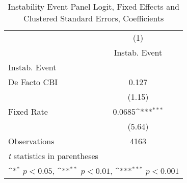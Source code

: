\begin{table}[htbp]\centering
\def\sym#1{\ifmmode^{#1}\else\(^{#1}\)\fi}
\caption{Instability Event Panel Logit, Fixed Effects and Clustered Standard Errors, Coefficients \label{coeffsJustBinInstabEventDF}}
\begin{tabular}{l*{1}{c}}
\toprule
                                        &\multicolumn{1}{c}{(1)}\\
                                        &\multicolumn{1}{c}{Instab. Event}\\
\midrule
Instab. Event                           &                  \\
De Facto CBI                            &    0.127         \\
                                        &   (1.15)         \\
\addlinespace
Fixed Rate                              &   0.0685\sym{***}\\
                                        &   (5.64)         \\
\midrule
Observations                            &     4163         \\
\bottomrule
\multicolumn{2}{l}{\footnotesize \textit{t} statistics in parentheses}\\
\multicolumn{2}{l}{\footnotesize \sym{*} \(p<0.05\), \sym{**} \(p<0.01\), \sym{***} \(p<0.001\)}\\
\end{tabular}
\end{table}
